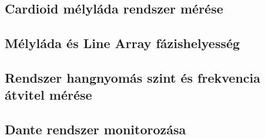 \subsection{Cardioid mélyláda rendszer mérése}



\subsection{Mélyláda és Line Array fázishelyesség}



\subsection{Rendszer hangnyomás szint és frekvencia átvitel mérése}



\subsection{Dante rendszer monitorozása}





